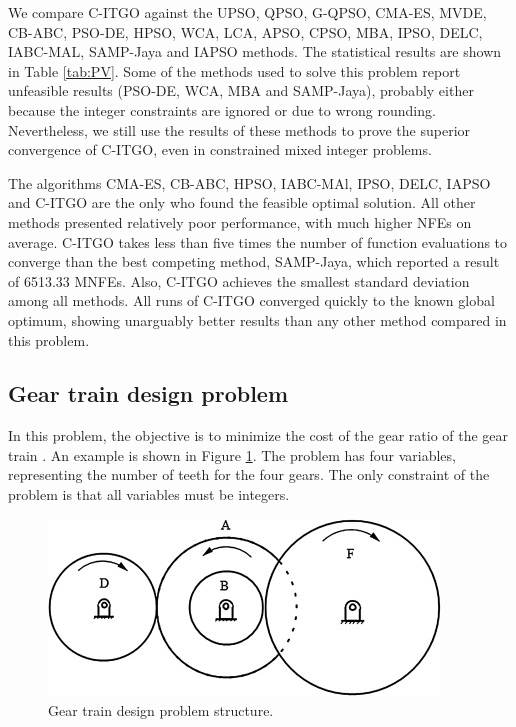 

We compare C-ITGO against the UPSO, QPSO, G-QPSO, CMA-ES, MVDE, CB-ABC, PSO-DE, HPSO, WCA, LCA, APSO, CPSO, MBA, IPSO, DELC, IABC-MAL, SAMP-Jaya and IAPSO methods. The statistical results are shown in Table \ref{tab:PV}. Some of the methods used to solve this problem report unfeasible results (PSO-DE, WCA, MBA and SAMP-Jaya), probably either because the integer constraints are ignored or due to wrong rounding. Nevertheless, we still use the results of these methods to prove the superior convergence of C-ITGO, even in constrained mixed integer problems.


The algorithms CMA-ES, CB-ABC, HPSO, IABC-MAl, IPSO, DELC, IAPSO and C-ITGO are the only who found the feasible optimal solution. All other methods presented relatively poor performance, with much higher NFEs on average. C-ITGO takes less than five times the number of function evaluations to converge than the best competing method, SAMP-Jaya, which reported a result of 6513.33 MNFEs. Also, C-ITGO achieves the smallest standard deviation among all methods. All runs of C-ITGO converged quickly to the known global optimum, showing unarguably better results than any other method compared in this problem.



\subsection{Gear train design problem}

In this problem, the objective is to minimize the cost of the gear ratio of the gear train \citep{PV}. An example is shown in Figure \ref{fig:GT}. The problem has four variables, representing the number of teeth for the four gears. The only constraint of the problem is that all variables must be integers.


\begin{figure}[h]
\begin{center}
\includegraphics[scale=0.6]{Imgs/GT.jpg}
\end{center}
\captionsetup{justification=centering}
\caption{Gear train design problem structure.}\label{fig:GT}
\end{figure}



